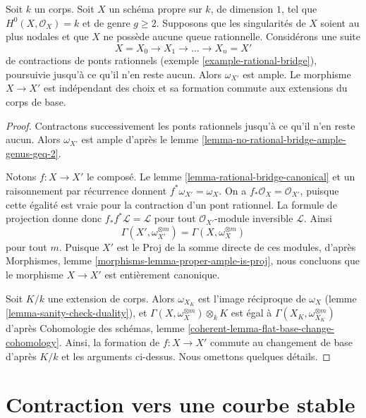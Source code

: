 \begin{lemma}
\label{lemma-contracting-rational-bridges}
Soit $k$ un corps. Soit $X$ un schéma propre sur $k$, de dimension $1$, tel que $H^0(X, \mathcal{O}_X) = k$ et de genre $g \geq 2$. Supposons que les singularités de $X$ soient au plus nodales et que $X$ ne possède aucune queue rationnelle. Considérons une suite $$
X = X_0 \to X_1 \to \ldots \to X_n = X'
$$ de contractions de ponts rationnels (exemple \ref{example-rational-bridge}), poursuivie jusqu'à ce qu'il n'en reste aucun. Alors $\omega_{X'}$ est ample. Le morphisme $X \to X'$ est indépendant des choix et sa formation commute aux extensions du corps de base.
\end{lemma}

\begin{proof}
Contractons successivement les ponts rationnels jusqu'à ce qu'il n'en reste aucun. Alors $\omega_{X'}$ est ample d'après le lemme \ref{lemma-no-rational-bridge-ample-genus-geq-2}.

\medskip\noindent
Notons $f : X \to X'$ le composé. Le lemme \ref{lemma-rational-bridge-canonical} et un raisonnement par récurrence donnent $f^*\omega_{X'} = \omega_X$. On a $f_*\mathcal{O}_X = \mathcal{O}_{X'}$, puisque cette égalité est vraie pour la contraction d'un pont rationnel. La formule de projection donne donc $f_*f^*\mathcal{L} = \mathcal{L}$ pour tout $\mathcal{O}_{X'}$-module inversible $\mathcal{L}$. Ainsi $$
\Gamma(X', \omega_{X'}^{\otimes m}) = \Gamma(X, \omega_X^{\otimes m})
$$ pour tout $m$. Puisque $X'$ est le Proj de la somme directe de ces modules, d'après Morphismes, lemme \ref{morphisms-lemma-proper-ample-is-proj}, nous concluons que le morphisme $X \to X'$ est entièrement canonique.

\medskip\noindent
Soit $K/k$ une extension de corps. Alors $\omega_{X_K}$ est l'image réciproque de $\omega_X$ (lemme \ref{lemma-sanity-check-duality}), et $\Gamma(X, \omega_X^{\otimes m}) \otimes_k K$ est égal à $\Gamma(X_K, \omega_{X_K}^{\otimes m})$ d'après Cohomologie des schémas, lemme \ref{coherent-lemma-flat-base-change-cohomology}. Ainsi, la formation de $f : X \to X'$ commute au changement de base d'après $K/k$ et les arguments ci-dessus. Nous omettons quelques détails.
\end{proof}






\section{Contraction vers une courbe stable}
\label{section-contracting-to-stable}


